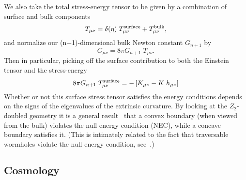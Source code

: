 \documentclass[a4paper,12pt]{article}
\begin{document}
We also take the total stress-energy tensor to be given by a
combination of surface and bulk components
%
\begin{equation}
T_{\mu\nu} = \delta(\eta) \;  T^{\mathrm{surface}}_{\mu\nu} + T^{\mathrm{bulk}}_{\mu\nu},
\end{equation}
%
and normalize our (n+1)-dimensional bulk Newton constant $G_{n+1}$ by
%
\begin{equation}
G_{\mu\nu} = 8\pi G_{n+1} \; T_{\mu\nu}.
\end{equation}
%
Then in particular, picking off the surface contribution to both the
Einstein tensor and the stress-energy
%
\begin{equation}
8 \pi G_{n+1} \; T^{\mathrm{surface}}_{\mu\nu} 
= - \left[ K_{\mu\nu} - K \; h_{\mu\nu} \right]
\end{equation}
%
Whether or not this surface stress tensor satisfies the energy
conditions depends on the signs of the eigenvalues of the extrinsic
curvature. By looking at the $Z_2$-doubled geometry it is a general
result~\cite{Book} that a convex boundary (when viewed from the bulk)
violates the null energy condition (NEC), while a concave boundary
satisfies it. (This is intimately related to the fact that traversable
wormholes violate the null energy condition,
see~\cite{Book,Surgery,Morris-Thorne,Hochberg,Survey,Examples}.)


\subsection{Cosmology}
\end{document}
